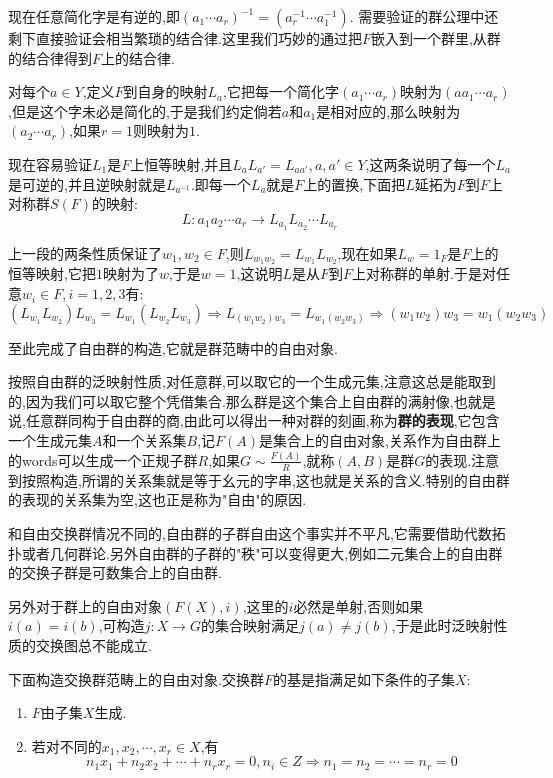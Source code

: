 \begin{enumerate}
	现在任意简化字是有逆的,即$(a_1\cdots a_r)^{-1}=(a_r^{-1}\cdots a_1^{-1})$. 需要验证的群公理中还剩下直接验证会相当繁琐的结合律.这里我们巧妙的通过把$F$嵌入到一个群里,从群的结合律得到$F$上的结合律.
	
	对每个$a\in Y$,定义$F$到自身的映射$L_a$,它把每一个简化字$(a_1\cdots a_r)$映射为$(aa_1\cdots a_r)$,但是这个字未必是简化的,于是我们约定倘若$a$和$a_1$是相对应的,那么映射为$(a_2\cdots a_r)$,如果$r=1$则映射为$1$.
	
	现在容易验证$L_1$是$F$上恒等映射,并且$L_aL_{a'}=L_{aa'},a,a'\in Y$,这两条说明了每一个$L_a$是可逆的,并且逆映射就是$L_{a^{-1}}$.即每一个$L_a$就是$F$上的置换,下面把$L$延拓为$F$到$F$上对称群$S(F)$的映射:
	$$L:a_1a_2\cdots a_r\to L_{a_1}L_{a_2}\cdots L_{a_r}$$
	
	上一段的两条性质保证了$w_1,w_2\in F$,则$L_{w_1w_2}=L_{w_1}L_{w_2}$,现在如果$L_w=1_F$是$F$上的恒等映射,它把$1$映射为了$w$,于是$w=1$,这说明$L$是从$F$到$F$上对称群的单射.于是对任意$w_i\in F,i=1,2,3$有:
	$$\left(L_{w_1}L_{w_2}\right)L_{w_3}=L_{w_1}\left(L_{w_2}L_{w_3}\right)\Rightarrow
	L_{(w_1w_2)w_3}=L_{w_1(w_2w_3)}\Rightarrow (w_1w_2)w_3=w_1(w_2w_3)$$
	
	至此完成了自由群的构造,它就是群范畴中的自由对象.
	
	按照自由群的泛映射性质,对任意群,可以取它的一个生成元集,注意这总是能取到的,因为我们可以取它整个凭借集合.那么群是这个集合上自由群的满射像,也就是说,任意群同构于自由群的商,由此可以得出一种对群的刻画,称为\textbf{群的表现},它包含一个生成元集$A$和一个关系集$B$,记$F(A)$是集合上的自由对象,关系作为自由群上的words可以生成一个正规子群$R$,如果$G\sim\frac{F(A)}{R}$,就称$(A,B)$是群$G$的表现.注意到按照构造,所谓的关系集就是等于幺元的字串,这也就是关系的含义.特别的自由群的表现的关系集为空,这也正是称为"自由"的原因.
	
	和自由交换群情况不同的,自由群的子群自由这个事实并不平凡,它需要借助代数拓扑或者几何群论.另外自由群的子群的"秩"可以变得更大,例如二元集合上的自由群的交换子群是可数集合上的自由群.
	
	另外对于群上的自由对象$(F(X),i)$,这里的$i$必然是单射,否则如果$i(a)=i(b)$,可构造$j:X\to G$的集合映射满足$j(a)\not=j(b)$,于是此时泛映射性质的交换图总不能成立.
	
	下面构造交换群范畴上的自由对象.交换群$F$的基是指满足如下条件的子集$X$:
	\begin{enumerate}
		\item $F$由子集$X$生成.
		\item 若对不同的$x_1,x_2,\cdots,x_r\in X$,有
		$$n_1x_1+n_2x_2+\cdots+n_rx_r=0,n_i\in Z\Rightarrow n_1=n_2=\cdots=n_r=0$$
	\end{enumerate}
	

\end{enumerate}
